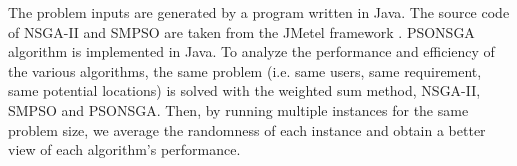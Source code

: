 \documentclass[10pt,journal,compsoc]{IEEEtran}
\newcommand{\Fig}[1]{Fig.~\ref{#1}}
\begin{document}
The problem inputs are generated by a program written in Java. The source code of NSGA-II and SMPSO are taken from the JMetel framework \cite{Durillo2011}. PSONSGA algorithm is implemented in Java.
To analyze the performance and efficiency of the various algorithms, the same problem (i.e. same users, same requirement, same potential locations) is solved with the weighted sum method, NSGA-II, SMPSO and PSONSGA. Then, by running multiple instances for the same problem size, we average the randomness of each instance and obtain a better view of each algorithm's performance.

%

%

\end{document}
